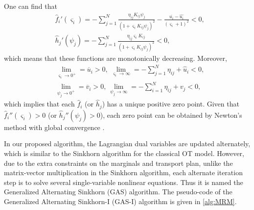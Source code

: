 \documentclass[review,hidelinks,onefignum,onetabnum]{siamart220329}
\begin{document}
One can find that
\begin{equation*}
\begin{aligned}
	&\hat{f}_i'(\varsigma_i)= -\sum_{j=1}^{N}\frac{\eta_{ij}K_{ij} \psi_j}{(1+\varsigma_i K_{ij} \psi_j)^2}-\frac{\overline{u_i}-\hat{u_i}}{(\varsigma_i+1)^2}<0, \\
    &\hat{h}_j'(\psi_j)=  -\sum_{j=1}^{N}\frac{\eta_{ij}\varsigma_i K_{ij}}{(1+\varsigma_i K_{ij} \psi_j)^2}<0, 
\end{aligned}
\end{equation*}
which means that these functions are monotonically decreasing.
Moreover,
\begin{equation*}
\begin{aligned}
	&\lim_{\varsigma_i\rightarrow 0^+}=\overline{u}_i>0, \ \lim_{\varsigma_i\rightarrow \infty}=-\sum_{j=1}^{N} \eta_{ij} +\hat{u}_i<0, \\
 &\lim_{\psi_j\rightarrow 0^+}=\overline{v}_i>0,\ \lim_{\psi_j\rightarrow \infty}=-\sum_{i=1}^{N} \eta_{ij} +v_j<0,  
\end{aligned}
\end{equation*}
which implies that each $\hat{f}_i$ (or $\hat{h}_j$) has a unique positive zero point. 
Given that
$\hat{f}_i''(\varsigma_i)> 0$ (or $\hat{h}_j''(\psi_j)>0$), each zero point can be obtained by Newton's method with global convergence \cite{kincaid2009numerical}. 



In our proposed algorithm, the Lagrangian dual variables are updated alternately, which is similar to the Sinkhorn algorithm for the classical OT model. However, due to the extra constraints on the marginals and transport plan, unlike the matrix-vector multiplication in the Sinkhorn algorithm, each alternate iteration step is to solve several single-variable nonlinear equations. Thus it is named the Generalized Alternating Sinkhorn (GAS) algorithm. 
The pseudo-code of the Generalized Alternating Sinkhorn-I (GAS-I) algorithm is given in \cref{alg:MRM}. 
\end{document}
